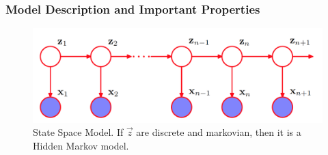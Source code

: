 \documentclass[12pt,twoside]{article}
\begin{document}
\subsubsection{Model Description and Important Properties}
\begin{figure}[H]
	\begin{center}
		\includegraphics[width = 0.7\hsize]{./figures/HiddenMarkovModel.png} %
		\caption{State Space Model. If $\vec{z}$ are discrete and markovian, then it is a Hidden Markov model.} %
		\label{fig:Hidden Markov Model} %
	\end{center}
\end{figure}
\end{document}
